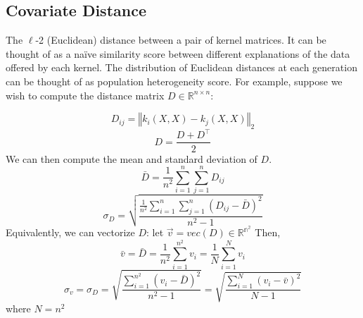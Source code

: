 \documentclass{article}
\begin{document}
\subsection{Covariate Distance}
The $\ell$-2 (Euclidean) distance between a pair of kernel matrices. It can be thought of as a naïve similarity score between different explanations of the data offered by each kernel. The distribution of Euclidean distances at each generation can be thought of as population heterogeneity score. For example, suppose we wish to compute the distance matrix $D \in \mathbb{R}^{n \times n}$:

\[D_{ij} = \left\Vert k_i(X, X) - k_j(X, X) \right\Vert_2 \]
\[D = \frac{D + D^\top}{2}\]
We can then compute the mean and standard deviation of $D$.
\[\bar{D} = \frac{1}{n^2} \sum_{i=1}^{n}\sum_{j=1}^{n} D_{ij} \]
\[\sigma_D = \sqrt{\frac{\frac{1}{n^2} \sum_{i=1}^{n}\sum_{j=1}^{n} (D_{ij} - \bar{D})^2}{n^2 - 1}}\]
Equivalently, we can vectorize $D$:
let $\vec{v} = vec(D)\in \mathbb{R^{n^2}}$
Then,
\[\bar{v} = \bar{D} = \frac{1}{n^2}\sum_{i=1}^{n^2} v_{i} = \frac{1}{N}\sum_{i=1}^{N} v_{i} \]
\[\sigma_v = \sigma_D = \sqrt{\frac{\sum_{i=1}^{n^2} (v_i - \bar{D})^2}{n^2 - 1}} = \sqrt{\frac{\sum_{i=1}^{N} (v_i - \bar{v})^2}{N - 1}}\]
where $N = n^2$
\end{document}
